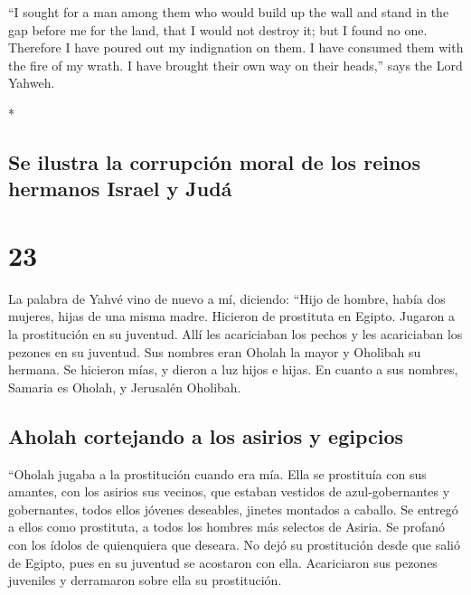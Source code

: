 \begin{paracol}{2}
\begin{otherlanguage}{english}
 ``I sought for a man among them who would build up the
wall and stand in the gap before me for the land, that I would not
destroy it; but I found no one.  Therefore I have poured
out my indignation on them. I have consumed them with the fire of my
wrath. I have brought their own way on their heads,'' says the Lord
Yahweh.

\end{otherlanguage}

\switchcolumn[0]*

\hypertarget{se-ilustra-la-corrupciuxf3n-moral-de-los-reinos-hermanos-israel-y-juduxe1}{%
\subsection{Se ilustra la corrupción moral de los reinos hermanos Israel
y
Judá}\label{se-ilustra-la-corrupciuxf3n-moral-de-los-reinos-hermanos-israel-y-juduxe1}}

\hypertarget{section-44}{%
\section{23}\label{section-44}}

 La palabra de Yahvé vino de nuevo a mí, diciendo:
 ``Hijo de hombre, había dos mujeres, hijas de una misma
madre.  Hicieron de prostituta en Egipto. Jugaron a la
prostitución en su juventud. Allí les acariciaban los pechos y les
acariciaban los pezones en su juventud.  Sus nombres eran
Oholah la mayor y Oholibah su hermana. Se hicieron mías, y dieron a luz
hijos e hijas. En cuanto a sus nombres, Samaria es Oholah, y Jerusalén
Oholibah.

\hypertarget{aholah-cortejando-a-los-asirios-y-egipcios}{%
\subsection{Aholah cortejando a los asirios y
egipcios}\label{aholah-cortejando-a-los-asirios-y-egipcios}}

 ``Oholah jugaba a la prostitución cuando era mía. Ella se
prostituía con sus amantes, con los asirios sus vecinos, 
que estaban vestidos de azul-gobernantes y gobernantes, todos ellos
jóvenes deseables, jinetes montados a caballo.  Se entregó
a ellos como prostituta, a todos los hombres más selectos de Asiria. Se
profanó con los ídolos de quienquiera que deseara.  No
dejó su prostitución desde que salió de Egipto, pues en su juventud se
acostaron con ella. Acariciaron sus pezones juveniles y derramaron sobre
ella su prostitución.


\end{paracol}
